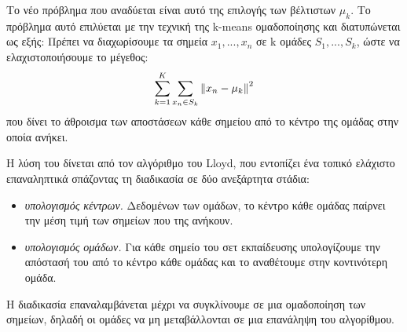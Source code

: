 	Το νέο πρόβλημα που αναδύεται είναι αυτό της επιλογής των βέλτιστων $\mu_k$. Το πρόβλημα αυτό επιλύεται με την τεχνική της k-means ομαδοποίησης και διατυπώνεται ως εξής: Πρέπει να διαχωρίσουμε τα σημεία $x_1,..., x_n$ σε k ομάδες $S_1,...,S_k$, ώστε να ελαχιστοποιήσουμε το μέγεθος:
	\begin{equation}
\sum_{k=1}^{K} \sum_{x_n \in S_k} \left\lVert x_n - \mu_k\right\rVert^2
\end{equation}
	που δίνει το άθροισμα των αποστάσεων κάθε σημείου από το κέντρο της ομάδας στην οποία ανήκει.
	
	Η λύση του δίνεται από τον αλγόριθμο του Lloyd, που εντοπίζει ένα τοπικό ελάχιστο επαναληπτικά σπάζοντας τη διαδικασία σε δύο ανεξάρτητα στάδια:
	\begin{itemize}
		\item \textit{υπολογισμός κέντρων.} Δεδομένων των ομάδων, το κέντρο κάθε ομάδας παίρνει την μέση τιμή των σημείων που της ανήκουν.
		\item \textit{υπολογισμός ομάδων.} Για κάθε σημείο του σετ εκπαίδευσης υπολογίζουμε την απόστασή του από το κέντρο κάθε ομάδας και το αναθέτουμε στην κοντινότερη ομάδα.
	\end{itemize}
	
	Η διαδικασία επαναλαμβάνεται μέχρι να συγκλίνουμε σε μια ομαδοποίηση των σημείων, δηλαδή οι ομάδες να μη μεταβάλλονται σε μια επανάληψη του αλγορίθμου.